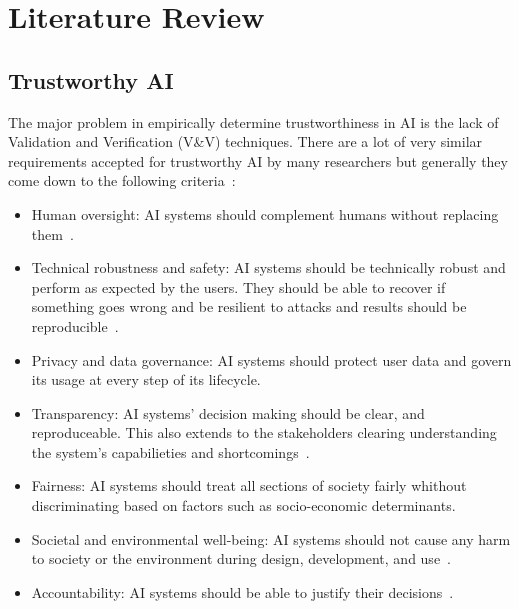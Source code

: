 \documentclass[a4paper]{article}
\begin{document}
\pagebreak


\section{Literature Review}

\subsection{Trustworthy AI}
The major problem in empirically determine trustworthiness in AI is the lack of Validation and Verification (V\&V) techniques. There are a lot of very similar requirements accepted for trustworthy AI by many researchers but generally they come down to the following criteria~\cite{kaur2022trustworthy}:
\begin{itemize}
    \item Human oversight: AI systems should complement humans without replacing them~\cite{daugherty2018human}.
    \item Technical robustness and safety: AI systems should be technically robust and perform as expected by the users. They should be able to recover if something goes wrong and be resilient to attacks and results should be reproducible~\cite{ethicseuarticle}.
    \item Privacy and data governance: AI systems should protect user data and govern its usage at every step of its lifecycle.
    \item Transparency: AI systems' decision making should be clear, and reproduceable. This also extends to the stakeholders clearing understanding the system's capabilieties and shortcomings~\cite{dignum2017responsible}.
    \item Fairness: AI systems should treat all sections of society fairly  whithout discriminating based on factors such as socio-economic determinants.
    \item Societal and environmental well-being: AI systems should not cause any harm to society or the environment during design, development, and use~\cite{flores2016false}.
    \item Accountability: AI systems should be able to justify their decisions~\cite{wieringa2020account}.
\end{itemize}
\end{document}
